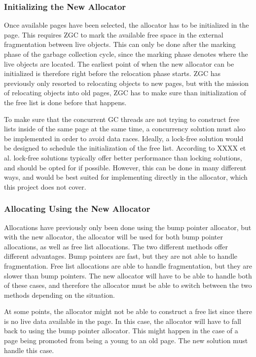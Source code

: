 \subsubsection{Initializing the New Allocator}
Once available pages have been selected, the allocator has to be initialized in the page. This requires ZGC to mark the available free space in the external fragmentation between live objects. This can only be done after the marking phase of the garbage collection cycle, since the marking phase denotes where the live objects are located. The earliest point of when the new allocator can be initialized is therefore right before the relocation phase starts. ZGC has previously only resorted to relocating objects to new pages, but with the mission of relocating objects into old pages, ZGC has to make sure than initialization of the free list is done before that happens. 

To make sure that the concurrent GC threads are not trying to construct free lists inside of the same page at the same time, a concurrency solution must also be implemented in order to avoid data races. Ideally, a lock-free solution would be designed to schedule the initialization of the free list. According to XXXX et al. lock-free solutions typically offer better performance than locking solutions, and should be opted for if possible. However, this can be done in many different ways, and would be best suited for implementing directly in the allocator, which this project does not cover.

\subsubsection{Allocating Using the New Allocator}
Allocations have previously only been done using the bump pointer allocator, but with the new allocator, the allocator will be used for both bump pointer allocations, as well as free list allocations. The two different methods offer different advantages. Bump pointers are fast, but they are not able to handle fragmentation. Free list allocations are able to handle fragmentation, but they are slower than bump pointers. The new allocator will have to be able to handle both of these cases, and therefore the allocator must be able to switch between the two methods depending on the situation. 

At some points, the allocator might not be able to construct a free list since there is no live data available in the page. In this case, the allocator will have to fall back to using the bump pointer allocator. This might happen in the case of a page being promoted from being a young to an old page. The new solution must handle this case.

